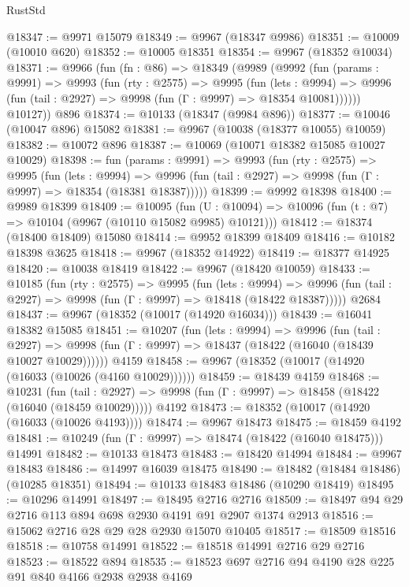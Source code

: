 \begin{lexlean}{RustStd}
\begin{coremodule}
@18347 := @9971 @15079
@18349 := @9967 (@18347 @9986)
@18351 := @10009 (@10010 @620)
@18352 := @10005 @18351
@18354 := @9967 (@18352 @10034)
@18371 := @9966
    (fun (fn : @86) =>
    @18349
      (@9989
        (@9992
          (fun (params : @9991) =>
          @9993
            (fun (rty : @2575) =>
            @9995
              (fun (lets : @9994) =>
              @9996 (fun (tail : @2927) => @9998 (fun (Γ : @9997) => @18354 @10081))))))
        @10127))
    @896
@18374 := @10133 (@18347 (@9984 @896))
@18377 := @10046 (@10047 @896) @15082
@18381 := @9967 (@10038 (@18377 @10055) @10059)
@18382 := @10072 @896
@18387 := @10069 (@10071 @18382 @15085 @10027 @10029)
@18398 := fun (params : @9991) =>
  @9993
    (fun (rty : @2575) =>
    @9995
      (fun (lets : @9994) =>
      @9996 (fun (tail : @2927) => @9998 (fun (Γ : @9997) => @18354 (@18381 @18387)))))
@18399 := @9992 @18398
@18400 := @9989 @18399
@18409 := @10095
    (fun (U : @10094) => @10096 (fun (t : @7) => @10104 (@9967 (@10110 @15082 @9985) @10121)))
@18412 := @18374 (@18400 @18409) @15080
@18414 := @9952 @18399 @18409
@18416 := @10182 @18398 @3625
@18418 := @9967 (@18352 @14922)
@18419 := @18377 @14925
@18420 := @10038 @18419
@18422 := @9967 (@18420 @10059)
@18433 := @10185
    (fun (rty : @2575) =>
    @9995
      (fun (lets : @9994) =>
      @9996 (fun (tail : @2927) => @9998 (fun (Γ : @9997) => @18418 (@18422 @18387)))))
    @2684
@18437 := @9967 (@18352 (@10017 (@14920 @16034)))
@18439 := @16041 @18382 @15085
@18451 := @10207
    (fun (lets : @9994) =>
    @9996
      (fun (tail : @2927) =>
      @9998 (fun (Γ : @9997) => @18437 (@18422 (@16040 (@18439 @10027 @10029))))))
    @4159
@18458 := @9967 (@18352 (@10017 (@14920 (@16033 (@10026 (@4160 @10029))))))
@18459 := @18439 @4159
@18468 := @10231
    (fun (tail : @2927) => @9998 (fun (Γ : @9997) => @18458 (@18422 (@16040 (@18459 @10029)))))
    @4192
@18473 := @18352 (@10017 (@14920 (@16033 (@10026 @4193))))
@18474 := @9967 @18473
@18475 := @18459 @4192
@18481 := @10249 (fun (Γ : @9997) => @18474 (@18422 (@16040 @18475))) @14991
@18482 := @10133 @18473
@18483 := @18420 @14994
@18484 := @9967 @18483
@18486 := @14997 @16039 @18475
@18490 := @18482 (@18484 @18486) (@10285 @18351)
@18494 := @10133 @18483 @18486 (@10290 @18419)
@18495 := @10296 @14991
@18497 := @18495 @2716 @2716
@18509 := @18497 @94 @29 @2716 @113 @894 @698 @2930 @4191 @91 @2907 @1374 @2913
@18516 := @15062 @2716 @28 @29 @28 @2930 @15070 @10405
@18517 := @18509 @18516
@18518 := @10758 @14991
@18522 := @18518 @14991 @2716 @29 @2716
@18523 := @18522 @894
@18535 := @18523 @697 @2716 @94 @4190 @28 @225 @91 @840 @4166 @2938 @2938 @4169

\end{coremodule}
\end{lexlean}

